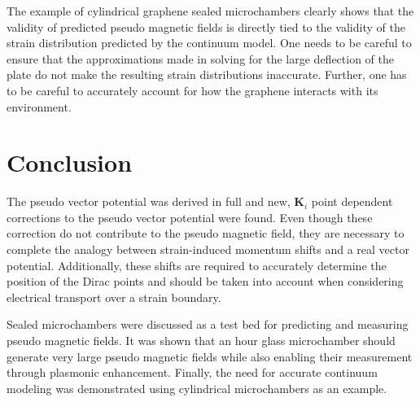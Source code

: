 The example of cylindrical graphene sealed microchambers clearly shows that the validity of predicted pseudo magnetic fields is directly tied to the validity of the strain distribution predicted by the continuum model.
One needs to be careful to ensure that the approximations made in solving for the large deflection of the plate do not make the resulting strain distributions inaccurate.
Further, one has to be careful to accurately account for how the graphene interacts with its environment.

\section{Conclusion}
The pseudo vector potential was derived in full and new, $\bm{K}_i$ point dependent corrections to the pseudo vector potential were found.
Even though these correction do not contribute to the pseudo magnetic field, they are necessary to complete the analogy between strain-induced momentum shifts and a real vector potential.
Additionally, these shifts are required to accurately determine the position of the Dirac points and should be taken into account when considering electrical transport over a strain boundary.

Sealed microchambers were discussed as a test bed for predicting and measuring pseudo magnetic fields.
It was shown that an hour glass microchamber should generate very large pseudo magnetic fields while also enabling their measurement through plasmonic enhancement.
Finally, the need for accurate continuum modeling was demonstrated using cylindrical microchambers as an example.